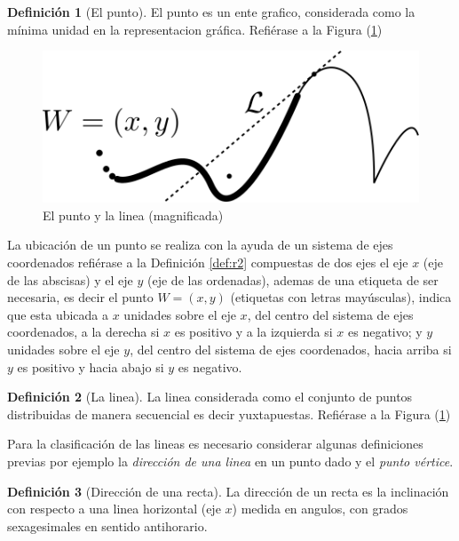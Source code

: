 \documentclass[
  16pt,
]{krantz}
\theoremstyle{definition}
\newtheorem{definition}{Definición}[chapter]
\theoremstyle{definition}
\theoremstyle{definition}
\theoremstyle{definition}
\theoremstyle{remark}
\begin{document}
\begin{definition}[El punto]
\protect\hypertarget{def:punto}{}{\label{def:punto} {} }El punto es un ente grafico, considerada como la mínima unidad en la representacion gráfica. Refiérase a la Figura (\ref{fig:puntolinea})
\end{definition}

\begin{figure}[!ht]

{\centering \includegraphics{puntolinea} 

}

\caption{El punto y la linea (magnificada)}\label{fig:puntolinea}
\end{figure}

La ubicación de un punto se realiza con la ayuda de un sistema de ejes coordenados refiérase a la Definición \ref{def:r2} compuestas de dos ejes el eje \(x\) (eje de las abscisas) y el eje \(y\) (eje de las ordenadas), ademas de una etiqueta de ser necesaria, es decir el punto \(W=(x,y)\) (etiquetas con letras mayúsculas), indica que esta ubicada a \(x\) unidades sobre el eje \(x\), del centro del sistema de ejes coordenados, a la derecha si \(x\) es positivo y a la izquierda si \(x\) es negativo; y \(y\) unidades sobre el eje \(y\), del centro del sistema de ejes coordenados, hacia arriba si \(y\) es positivo y hacia abajo si \(y\) es negativo.

\begin{definition}[La linea]
\protect\hypertarget{def:linea}{}{\label{def:linea} {} }La linea considerada como el conjunto de puntos distribuidas de manera secuencial es decir yuxtapuestas. Refiérase a la Figura (\ref{fig:puntolinea})
\end{definition}

Para la clasificación de las lineas es necesario considerar algunas definiciones previas por ejemplo la \emph{dirección de una linea} en un punto dado y el \emph{punto vértice}.

\begin{definition}[Dirección de una recta]
\protect\hypertarget{def:direccionrecta}{}{\label{def:direccionrecta} {} }La dirección de un recta es la inclinación con respecto a una linea horizontal (eje \(x\)) medida en angulos, con grados sexagesimales en sentido antihorario.
\end{definition}
\end{document}
